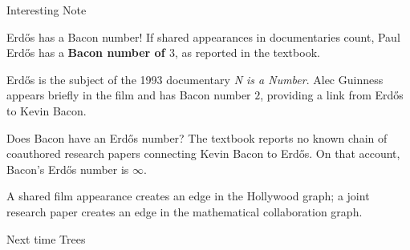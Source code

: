 \documentclass[aspectratio=169,11pt]{beamer}
\begin{document}
\begin{frame}[t]{Interesting Note}
\begin{block}{Erd\H{o}s has a Bacon number!}
If shared appearances in documentaries count, Paul Erd\H{o}s has a \textbf{Bacon number of $3$}, as reported in the textbook.

\medskip
Erd\H{o}s is the subject of the 1993 documentary \emph{N is a Number}. Alec Guinness appears briefly in the film and has Bacon number $2$, providing a link from Erd\H{o}s to Kevin Bacon.
\end{block}

\vspace{0.25cm}
\begin{block}{Does Bacon have an Erd\H{o}s number?}
The textbook reports no known chain of coauthored research papers connecting Kevin Bacon to Erd\H{o}s. On that account, Bacon's Erd\H{o}s number is $\infty$.

\medskip
A shared film appearance creates an edge in the Hollywood graph; a joint research paper creates an edge in the mathematical collaboration graph.
\end{block}
\end{frame}


\begin{frame}{Next time}
\centering
\vfill
{\Huge\color{RamBlue} Trees}
\vfill
\end{frame}
\end{document}
